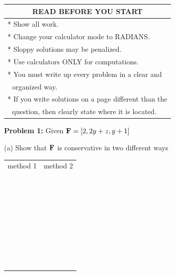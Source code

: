 \documentclass[12pt]{amsart}
\numberwithin{equation}{section}
\begin{document}
\begin{center}
	\setlength{\extrarowheight}{0.2cm}
	\begin{tabular}{| p{12cm} |}
		\hline
		\multicolumn{1}{|c|}{{\bf READ BEFORE YOU START}} \\
		\hline
		 * Show all work.\\
		 * Change your calculator mode to RADIANS.\\
		 * Sloppy solutions may be penalized.\\
		 * Use calculators ONLY for computations.\\
		 * You must write up every problem in a clear and \\
		 $\,\,$ organized way.\\
		 * If you write solutions on a page different than the \\
		 $\,\,$ question, then clearly state where it is located.\\
		\hline
	\end{tabular}

\end{center}

\vspace{1.0cm}

\thispagestyle{empty}
\newpage
\thispagestyle{empty}

{\bf Problem 1:} Given $\text{\bf F} = [2,2y+z,y+1]$

(a) Show that $\text{\bf F}$ is conservative in two different ways

	\begin{tabular}{p{10cm}|p{10cm}}
		\multicolumn{1}{c|}{method 1}&\multicolumn{1}{c}{method 2}\\
		&\\&\\&\\&\\&\\&\\&\\&\\&\\&\\&\\&\\&\\&\\&\\&\\&\\&\\&\\&\\&\\&\\&\\&\\&\\&\\&\\&\\&\\&\\&\\&\\&\\&\\&\\&\\&\\
	\end{tabular}
\end{document}
